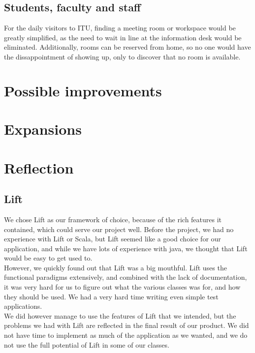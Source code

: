 \subsection{Students, faculty and staff}
For the daily visitors to ITU, finding a meeting room or workspace would be greatly simplified, as the need to wait in line at the information desk would be eliminated. Additionally, rooms can be reserved from home, so no one would have the dissappointment of showing up, only to discover that no room is available.

\section{Possible improvements}

\section{Expansions}

\section{Reflection}
\label{sec:reflection}

\subsection{Lift}
We chose Lift as our framework of choice, because of the rich features it contained, which could serve our project well. Before the project, we had no experience with Lift or Scala, but Lift seemed like a good choice for our application, and while we have lots of experience with java, we thought that Lift would be easy to get used to.\\
However, we quickly found out that Lift was a big mouthful. Lift uses the functional paradigms extensively, and combined with the lack of documentation, it was very hard for us to figure out what the various classes was for, and how they should be used. We had a very hard time writing even simple test applications.\\
We did however manage to use the features of Lift that we intended, but the problems we had with Lift are reflected in the final result of our product. We did not have time to implement as much of the application as we wanted, and we do not use the full potential of Lift in some of our classes. \\

